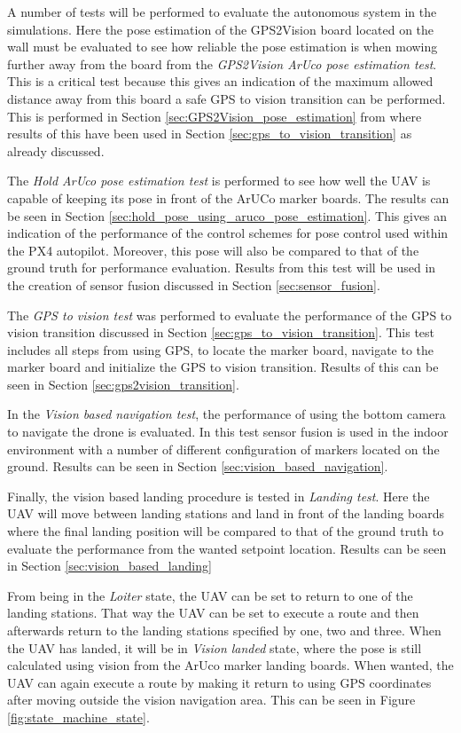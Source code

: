 \documentclass[../Head/report.tex]{subfiles}
\begin{document}
A number of tests will be performed to evaluate the autonomous system in the simulations. Here the pose estimation of the GPS2Vision board located on the wall must be evaluated to see how reliable the pose estimation is when mowing further away from the board from the \textit{GPS2Vision ArUco pose estimation test}. This is a critical test because this gives an indication of the maximum allowed distance away from this board a safe GPS to vision transition can be performed. This is performed in Section \ref{sec:GPS2Vision_pose_estimation} from where results of this have been used in Section \ref{sec:gps_to_vision_transition} as already discussed. 

The \textit{Hold ArUco pose estimation test} is performed to see how well the UAV is capable of keeping its pose in front of the ArUCo marker boards. The results can be seen in Section \ref{sec:hold_pose_using_aruco_pose_estimation}. This gives an indication of the performance of the control schemes for pose control used within the PX4 autopilot. Moreover, this pose will also be compared to that of the ground truth for performance evaluation. Results from this test will be used in the creation of sensor fusion discussed in Section \ref{sec:sensor_fusion}.

The \textit{GPS to vision test} was performed to evaluate the performance of the GPS to vision transition discussed in Section \ref{sec:gps_to_vision_transition}. This test includes all steps from using GPS, to locate the marker board, navigate to the marker board and initialize the GPS to vision transition. Results of this can be seen in Section \ref{sec:gps2vision_transition}.

In the \textit{Vision based navigation test}, the performance of using the bottom camera to navigate the drone is evaluated. In this test sensor fusion is used in the indoor environment with a number of different configuration of markers located on the ground. Results can be seen in Section \ref{sec:vision_based_navigation}. 

Finally, the vision based landing procedure is tested in \textit{Landing test}. Here the UAV will move between landing stations and land in front of the landing boards where the final landing position will be compared to that of the ground truth to evaluate the performance from the wanted setpoint location. Results can be seen in Section \ref{sec:vision_based_landing}

From being in the \textit{Loiter} state, the UAV can be set to return to one of the landing stations. That way the UAV can be set to execute a route and then afterwards return to the landing stations specified by one, two and three. When the UAV has landed, it will be in \textit{Vision landed} state, where the pose is still calculated using vision from the ArUco marker landing boards. When wanted, the UAV can again execute a route by making it return to using GPS coordinates after moving outside the vision navigation area. This can be seen in Figure \ref{fig:state_machine_state}. 
\end{document}
